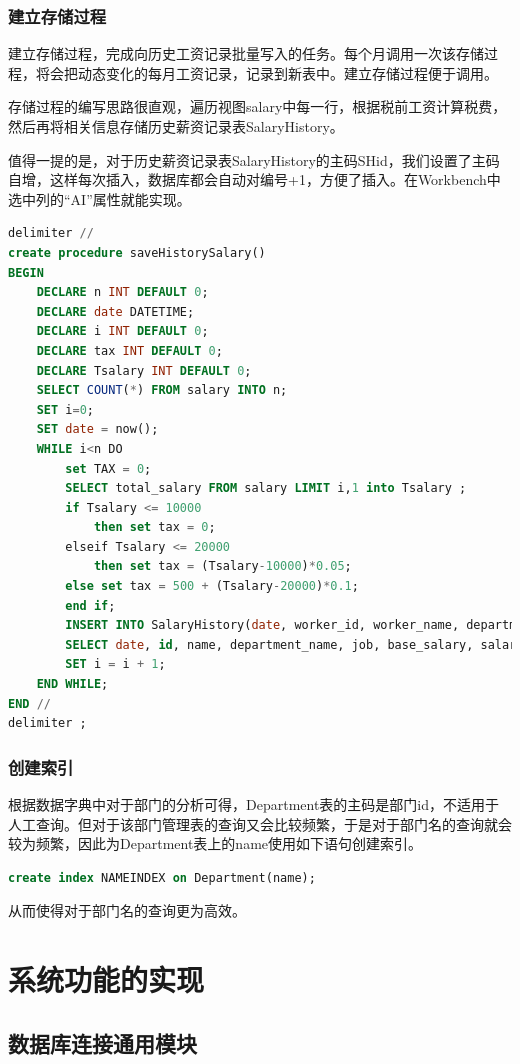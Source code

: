 \documentclass[withoutpreface,bwprint]{cumcmthesis} %
\begin{document}
\subsubsection{建立存储过程}
建立存储过程，完成向历史工资记录批量写入的任务。每个月调用一次该存储过程，将会把动态变化的每月工资记录，记录到新表中。建立存储过程便于调用。\par 
存储过程的编写思路很直观，遍历视图salary中每一行，根据税前工资计算税费，然后再将相关信息存储历史薪资记录表SalaryHistory。\par 
值得一提的是，对于历史薪资记录表SalaryHistory的主码SHid，我们设置了主码自增，这样每次插入，数据库都会自动对编号+1，方便了插入。在Workbench中选中列的“AI”属性就能实现。
\begin{lstlisting}[language=SQL]
delimiter //
create procedure saveHistorySalary()
BEGIN
	DECLARE n INT DEFAULT 0;
    DECLARE date DATETIME;
	DECLARE i INT DEFAULT 0;
	DECLARE tax INT DEFAULT 0;
	DECLARE Tsalary INT DEFAULT 0;
	SELECT COUNT(*) FROM salary INTO n;
	SET i=0;
    SET date = now();
	WHILE i<n DO 
		set TAX = 0;
        SELECT total_salary FROM salary LIMIT i,1 into Tsalary ;
        if Tsalary <= 10000
    		then set tax = 0;
    	elseif Tsalary <= 20000
    		then set tax = (Tsalary-10000)*0.05;
    	else set tax = 500 + (Tsalary-20000)*0.1;
    	end if;
    	INSERT INTO SalaryHistory(date, worker_id, worker_name, department_name, job, base_salary, salary, punishment, before_tax, tax, total_salary) 
        SELECT date, id, name, department_name, job, base_salary, salary, LatePUnish, total_salary, tax, total_salary-tax FROM salary LIMIT i,1;
  		SET i = i + 1;
	END WHILE;
END //
delimiter ;
\end{lstlisting}
\subsubsection{创建索引}
根据数据字典中对于部门的分析可得，Department表的主码是部门id，不适用于人工查询。但对于该部门管理表的查询又会比较频繁，于是对于部门名的查询就会较为频繁，因此为Department表上的name使用如下语句创建索引。
\begin{lstlisting}[language=SQL]
create index NAMEINDEX on Department(name);
\end{lstlisting}
从而使得对于部门名的查询更为高效。

\section{系统功能的实现}

\subsection{数据库连接通用模块}
\end{document}
